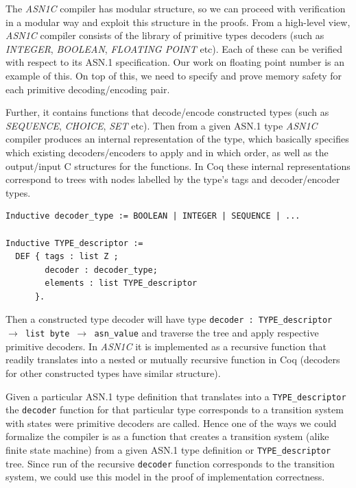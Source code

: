 \documentclass[acmsmall,nonacm]{acmart}
\begin{document}
The \emph{ASN1C} compiler has modular structure, so we can proceed with
verification in a modular way and exploit this structure in the
proofs. From a high-level view, \emph{ASN1C} compiler consists of
the library of primitive types decoders (such as \emph{INTEGER}, \emph{BOOLEAN},
\emph{FLOATING POINT} etc). Each of these can be verified with respect to its
ASN.1 specification. Our work on floating point number is an example
of this. On top of this, we need to specify and prove memory safety
for each primitive decoding/encoding pair.

Further, it contains functions that decode/encode
constructed types (such as \emph{SEQUENCE}, \emph{CHOICE}, \emph{SET} etc). Then from a
given ASN.1 type \emph{ASN1C} compiler produces an internal
representation of the type, which basically specifies which existing
decoders/encoders to apply and in which order, as well as the
output/input C structures for the functions. In Coq
these internal representations correspond to trees with nodes labelled by the
type's tags and decoder/encoder types.

 \begin{lstlisting}[language=Coq]
Inductive decoder_type := BOOLEAN | INTEGER | SEQUENCE | ...

Inductive TYPE_descriptor :=
  DEF { tags : list Z ;
        decoder : decoder_type;
        elements : list TYPE_descriptor 
      }.
 \end{lstlisting}

 Then a constructed type decoder will have type \texttt{decoder : TYPE\_descriptor $\rightarrow$ list byte $\rightarrow$ asn\_value}  and traverse the tree and apply
 respective primitive decoders. In \emph{ASN1C} it is implemented as
 a recursive function that readily translates into a nested or mutually recursive
 function in Coq (decoders for other constructed types have similar
 structure).

 Given a particular ASN.1 type definition that translates into a
 \texttt{TYPE\_descriptor} the \texttt{decoder} function for that
 particular type corresponds to a transition system with states were
 primitive decoders are called. Hence one of the ways we could
 formalize the compiler is as a function that creates a transition
 system (alike finite state machine) from a given ASN.1 type
 definition or \texttt{TYPE\_descriptor} tree. Since run of the
 recursive \texttt{decoder} function corresponds to the transition
 system, we could use this model in the proof of implementation
 correctness.
\end{document}
